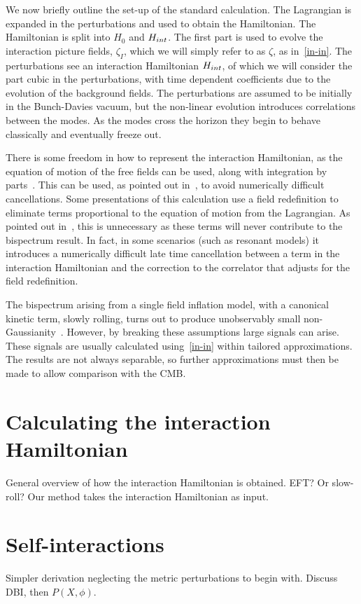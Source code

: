 We now briefly outline the set-up of the standard calculation.
The Lagrangian is expanded in the perturbations and used to obtain the Hamiltonian.
The Hamiltonian is split into $H_0$ and $H_{int}$.
The first part is used to evolve the interaction picture fields, $\zeta_I$,
which we will simply refer to as $\zeta$, as in~\eqref{in-in}.
The perturbations see an interaction Hamiltonian $H_{int}$,
of which we will consider the part cubic in the perturbations,
with time dependent coefficients due to the evolution of the background fields.
The perturbations are assumed to be initially in the Bunch-Davies vacuum,
but the non-linear
evolution introduces correlations between the modes.
As the modes cross the horizon they begin to behave classically
and eventually freeze out.


There is some freedom in how to represent the interaction Hamiltonian,
as the equation of motion of the free fields can be used, along with integration by parts~\cite{rp_integ_by_parts}.
This can be used, as pointed out in~\cite{Funakoshi}, to avoid numerically difficult cancellations.
Some presentations of this calculation use a field redefinition to eliminate terms
proportional to the equation of motion from the Lagrangian.
As pointed out in~\cite{px_burrage},
this is unnecessary as these terms will never contribute to the bispectrum result.
In fact, in some scenarios (such as resonant models) it introduces a numerically difficult
late time cancellation between a term in the interaction Hamiltonian and the
correction to the correlator that adjusts for the field redefinition.


The bispectrum arising from a single field inflation model,
with a canonical kinetic term, slowly rolling, turns out to produce
unobservably small non-Gaussianity~\cite{Maldacena}.
However, by breaking these assumptions large signals can arise.
These signals are usually calculated using~\eqref{in-in} within tailored approximations.
The results are not always separable, so further approximations must then be made to
allow comparison with the CMB.
    \section{Calculating the interaction Hamiltonian}
    General overview of how the interaction Hamiltonian is obtained.
    EFT? Or slow-roll? Our method takes the interaction Hamiltonian
    as input.
    \section{Self-interactions}
    Simpler derivation neglecting the metric perturbations to begin with.
    Discuss DBI, then $P(X, \phi)$.


